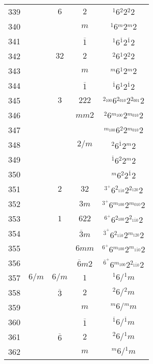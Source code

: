 \begin{longtable}{ccccc}
  339 &  & $6$ & $2$ & ${}^{1} 6 {}^{2} 2 {}^{2} 2 $\\
  340 &  &  & $m$ & ${}^{1} 6 {}^{m} 2 {}^{m} 2 $\\
  341 &  &  & $\overline{1}$ & ${}^{1} 6 {}^{\overline{1}} 2 {}^{\overline{1}} 2 $\\
  342 &  & $32$ & $2$ & ${}^{2} 6 {}^{1} 2 {}^{2} 2 $\\
  343 &  &  & $m$ & ${}^{m} 6 {}^{1} 2 {}^{m} 2 $\\
  344 &  &  & $\overline{1}$ & ${}^{\overline{1}} 6 {}^{1} 2 {}^{\overline{1}} 2 $\\
  345 &  & $3$ & $222$ & ${}^{2_{100}} 6 {}^{2_{010}} 2 {}^{2_{001}} 2 $\\
  346 &  &  & $mm2$ & ${}^{2} 6 {}^{m_{100}} 2 {}^{m_{010}} 2 $\\
  347 &  &  &  & ${}^{m_{100}} 6 {}^{2} 2 {}^{m_{010}} 2 $\\
  348 &  &  & $2/m$ & ${}^{2} 6 {}^{\overline{1}} 2 {}^{m} 2 $\\
  349 &  &  &  & ${}^{\overline{1}} 6 {}^{2} 2 {}^{m} 2 $\\
  350 &  &  &  & ${}^{m} 6 {}^{2} 2 {}^{\overline{1}} 2 $\\
  351 &  & $2$ & $32$ & ${}^{3^{+}} 6 {}^{2_{1\overline{1}0}} 2 {}^{2_{120}} 2 $\\
  352 &  &  & $3m$ & ${}^{3^{+}} 6 {}^{m_{100}} 2 {}^{m_{010}} 2 $\\
  353 &  & $1$ & $622$ & ${}^{6^{+}} 6 {}^{2_{100}} 2 {}^{2_{1\overline{1}0}} 2 $\\
  354 &  &  & $\overline{3}m$ & ${}^{\overline{3}^{+}} 6 {}^{2_{1\overline{1}0}} 2 {}^{m_{120}} 2 $\\
  355 &  &  & $6mm$ & ${}^{6^{+}} 6 {}^{m_{100}} 2 {}^{m_{1\overline{1}0}} 2 $\\
  356 &  &  & $\overline{6}m2$ & ${}^{\overline{6}^{+}} 6 {}^{m_{100}} 2 {}^{2_{1\overline{1}0}} 2 $\\
  357 & $6/m$ & $6/m$ & $1$ & ${}^{1} 6  / {}^{1} m $\\
  358 &  & $\overline{3}$ & $2$ & ${}^{2} 6  / {}^{2} m $\\
  359 &  &  & $m$ & ${}^{m} 6  / {}^{m} m $\\
  360 &  &  & $\overline{1}$ & ${}^{\overline{1}} 6  / {}^{\overline{1}} m $\\
  361 &  & $\overline{6}$ & $2$ & ${}^{2} 6  / {}^{1} m $\\
  362 &  &  & $m$ & ${}^{m} 6  / {}^{1} m $\\

\end{longtable}
